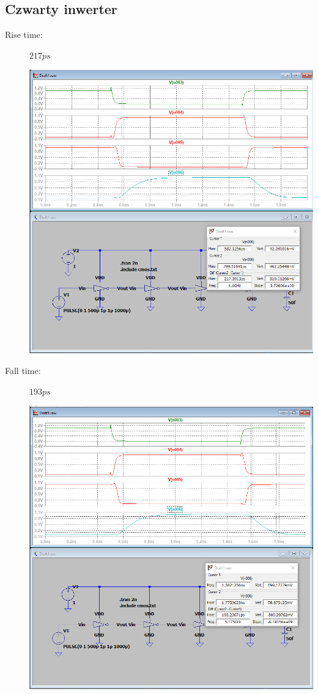 \documentclass[a4paper, 11pt]{article}
\begin{document}
\subsection{Czwarty inwerter}
\begin{description}
	\item[Rise time:] $217 ps$ \hfill
	      \begin{center}
		      \includegraphics[scale=0.38]{mikro_lab3/rise_time3.PNG}
	      \end{center}
	\item[Fall time:] $193 ps$ \hfill
	      \begin{center}
		      \includegraphics[scale=0.38]{mikro_lab3/fall_time3.PNG}

\end{center}
\end{description}
\end{document}
